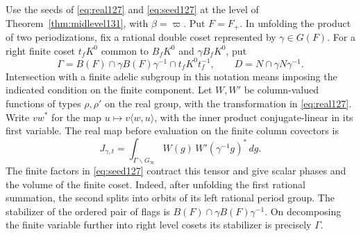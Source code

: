 \documentclass[a4paper,11pt]{article}
\theoremstyle{definition}
\theoremstyle{remark}
\numberwithin{equation}{section}
\begin{document}
Use the seeds of \eqref{eq:real127} and \eqref{eq:seed127} at
the level of Theorem~\ref{thm:midlevel131}, with \(\beta=\varpi\).
Put \(F=F_+\). In unfolding the product of two periodizations,
fix a rational double coset represented by \(\gamma\in G(F)\).
For a right finite coset \(t_fK^0\) common to \(B_fK^0\) and
\(\gamma B_fK^0\), put
\[
 \Gamma=B(F)\cap\gamma B(F)\gamma^{-1}\cap t_fK^0t_f^{-1},
 \qquad D=N\cap\gamma N\gamma^{-1}.
\]
Intersection with a finite adelic subgroup in this notation
means imposing the indicated condition on the finite component.
Let \(W,W'\) be column-valued functions of types \(\rho,\rho'\)
on the real group, with the transformation in \eqref{eq:real127}.
Write \(vw^*\) for the map \(u\mapsto v\langle w,u\rangle\),
with the inner product conjugate-linear in its first variable.
The real map before evaluation on the finite column covectors is
\begin{equation}
   J_{\gamma,t}=\int_{\Gamma\backslash G_\infty}
                 W(g)\,W'(\gamma^{-1}g)^*\,dg .
   \label{eq:orb133}
\end{equation}
The finite factors in \eqref{eq:seed127} contract this tensor
and give scalar phases and the volume of the finite coset.
Indeed, after unfolding the first rational summation, the
second splits into orbits of its left rational period group.
The stabilizer of the ordered pair of flags is
\(B(F)\cap\gamma B(F)\gamma^{-1}\). On decomposing the finite
variable further into right level cosets its stabilizer is
precisely \(\Gamma\).
\end{document}
